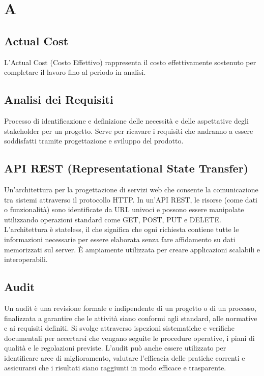 \documentclass{article}
\begin{document}


\section{A}

\subsection{Actual Cost}
L’Actual Cost (Costo Effettivo) rappresenta il costo effettivamente sostenuto per completare il lavoro fino al periodo in analisi.

\subsection{Analisi dei Requisiti}
Processo di identificazione e definizione delle necessità e delle aspettative degli stakeholder per un progetto. Serve per ricavare i requisiti che andranno a essere soddisfatti tramite progettazione e sviluppo del prodotto.

\subsection{API REST (Representational State Transfer)}
Un'architettura per la progettazione di servizi web che consente la comunicazione tra sistemi attraverso il protocollo HTTP. In un'API REST, le risorse (come dati o funzionalità) sono identificate da URL univoci e possono essere manipolate utilizzando operazioni standard come GET, POST, PUT e DELETE. L'architettura è stateless, il che significa che ogni richiesta contiene tutte le informazioni necessarie per essere elaborata senza fare affidamento su dati memorizzati sul server. È ampiamente utilizzata per creare applicazioni scalabili e interoperabili.

\subsection{Audit}
Un audit è una revisione formale e indipendente di un progetto o di un processo, finalizzata a garantire che le attività siano conformi agli standard, alle normative e ai requisiti definiti. Si svolge attraverso ispezioni sistematiche e verifiche documentali per accertarsi che vengano seguite le procedure operative, i piani di qualità e le regolazioni previste. L’audit può anche essere utilizzato per identificare aree di miglioramento, valutare l’efficacia delle pratiche correnti e assicurarsi che i risultati siano raggiunti in modo efficace e trasparente.
\end{document}
